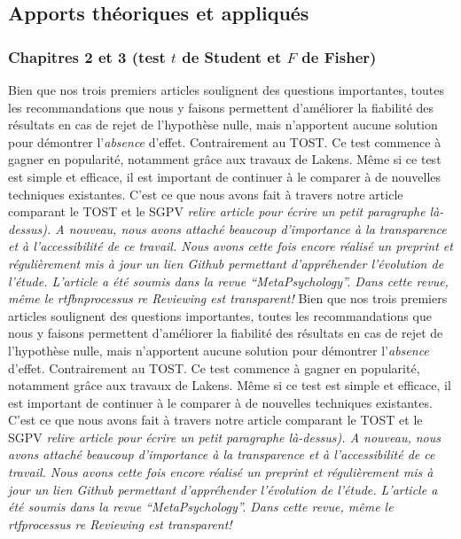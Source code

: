 \documentclass[
  12pt,
  french,
]{article}
\begin{document}
\hypertarget{apports-thuxe9oriques-et-appliquuxe9s}{%
\subsection{Apports théoriques et
appliqués}\label{apports-thuxe9oriques-et-appliquuxe9s}}

\hypertarget{chapitres-2-et-3-test-t-de-student-et-f-de-fisher}{%
\subsubsection{\texorpdfstring{Chapitres 2 et 3 (test \(t\) de Student
et \(F\) de
Fisher)}{Chapitres 2 et 3 (test t de Student et F de Fisher)}}\label{chapitres-2-et-3-test-t-de-student-et-f-de-fisher}}

\color{brown} Bien que nos trois premiers articles soulignent des
questions importantes, toutes les recommandations que nous y faisons
permettent d'améliorer la fiabilité des résultats en cas de rejet de
l'hypothèse nulle, mais n'apportent aucune solution pour démontrer
l'\emph{absence} d'effet. Contrairement au TOST. Ce test commence à
gagner en popularité, notamment grâce aux travaux de Lakens. Même si ce
test est simple et efficace, il est important de continuer à le comparer
à de nouvelles techniques existantes. C'est ce que nous avons fait à
travers notre article comparant le TOST et le SGPV \emph{relire article
pour écrire un petit paragraphe là-dessus). A nouveau, nous avons
attaché beaucoup d'importance à la transparence et à l'accessibilité de
ce travail. Nous avons cette fois encore réalisé un preprint et
régulièrement mis à jour un lien Github permettant d'appréhender
l'évolution de l'étude. L'article a été soumis dans la revue
``MetaPsychology''. Dans cette revue, même le rtfbnprocessus re
Reviewing est transparent!} \color{brown} Bien que nos trois premiers
articles soulignent des questions importantes, toutes les
recommandations que nous y faisons permettent d'améliorer la fiabilité
des résultats en cas de rejet de l'hypothèse nulle, mais n'apportent
aucune solution pour démontrer l'\emph{absence} d'effet. Contrairement
au TOST. Ce test commence à gagner en popularité, notamment grâce aux
travaux de Lakens. Même si ce test est simple et efficace, il est
important de continuer à le comparer à de nouvelles techniques
existantes. C'est ce que nous avons fait à travers notre article
comparant le TOST et le SGPV \emph{relire article pour écrire un petit
paragraphe là-dessus). A nouveau, nous avons attaché beaucoup
d'importance à la transparence et à l'accessibilité de ce travail. Nous
avons cette fois encore réalisé un preprint et régulièrement mis à jour
un lien Github permettant d'appréhender l'évolution de l'étude.
L'article a été soumis dans la revue ``MetaPsychology''. Dans cette
revue, même le rtfprocessus re Reviewing est transparent!}
\end{document}
